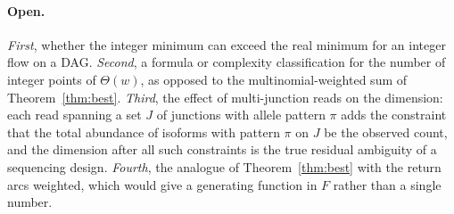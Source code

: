 \documentclass[11pt]{article}
\theoremstyle{plain}
\theoremstyle{definition}
\theoremstyle{remark}
\newcommand{\Th}{\Theta}
\begin{document}
\paragraph{Open.} \emph{First}, whether the integer minimum can exceed the real minimum
for an integer flow on a DAG. \emph{Second}, a formula or complexity classification for the
number of integer points of $\Th(w)$, as opposed to the multinomial-weighted sum of
Theorem~\ref{thm:best}. \emph{Third}, the effect of multi-junction reads on the dimension:
each read spanning a set $J$ of junctions with allele pattern $\pi$ adds the constraint that
the total abundance of isoforms with pattern $\pi$ on $J$ be the observed count, and the
dimension after all such constraints is the true residual ambiguity of a sequencing design.
\emph{Fourth}, the analogue of Theorem~\ref{thm:best} with the return arcs weighted, which
would give a generating function in $F$ rather than a single number.
\end{document}
